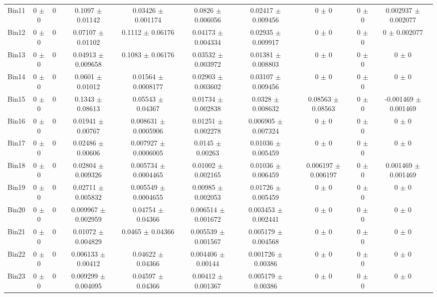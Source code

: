 \begin{tabular}{@{\extracolsep{4pt}}lccccccccc@{}}
     Bin11 & 0 $\pm$ 0 & 0 & 0.1097 $\pm$ 0.01142 & 0.03426 $\pm$ 0.001174 & 0.0826 $\pm$ 0.006056 & 0.02417 $\pm$ 0.009456 & 0 $\pm$ 0 & 0 $\pm$ 0 & 0.002937 $\pm$ 0.002077 \\ 
     Bin12 & 0 $\pm$ 0 & 0 & 0.07107 $\pm$ 0.01102 & 0.1112 $\pm$ 0.06176 & 0.04173 $\pm$ 0.004334 & 0.02935 $\pm$ 0.009917 & 0 $\pm$ 0 & 0 $\pm$ 0 & 0 $\pm$ 0.002077 \\ 
     Bin13 & 0 $\pm$ 0 & 0 & 0.04913 $\pm$ 0.009658 & 0.1083 $\pm$ 0.06176 & 0.03532 $\pm$ 0.003972 & 0.01381 $\pm$ 0.008803 & 0 $\pm$ 0 & 0 $\pm$ 0 & 0 $\pm$ 0 \\ 
     Bin14 & 0 $\pm$ 0 & 0 & 0.0601 $\pm$ 0.01012 & 0.01564 $\pm$ 0.0008177 & 0.02903 $\pm$ 0.003602 & 0.03107 $\pm$ 0.009456 & 0 $\pm$ 0 & 0 $\pm$ 0 & 0 $\pm$ 0 \\ 
     Bin15 & 0 $\pm$ 0 & 0 & 0.1343 $\pm$ 0.08613 & 0.05543 $\pm$ 0.04367 & 0.01734 $\pm$ 0.002838 & 0.0328 $\pm$ 0.008632 & 0.08563 $\pm$ 0.08563 & 0 $\pm$ 0 & -0.001469 $\pm$ 0.001469 \\ 
     Bin16 & 0 $\pm$ 0 & 0 & 0.01941 $\pm$ 0.00767 & 0.008631 $\pm$ 0.0005906 & 0.01251 $\pm$ 0.002278 & 0.006905 $\pm$ 0.007324 & 0 $\pm$ 0 & 0 $\pm$ 0 & 0 $\pm$ 0 \\ 
     Bin17 & 0 $\pm$ 0 & 0 & 0.02486 $\pm$ 0.00606 & 0.007927 $\pm$ 0.0006005 & 0.0145 $\pm$ 0.00263 & 0.01036 $\pm$ 0.005459 & 0 $\pm$ 0 & 0 $\pm$ 0 & 0 $\pm$ 0 \\ 
     Bin18 & 0 $\pm$ 0 & 0 & 0.02804 $\pm$ 0.009326 & 0.005734 $\pm$ 0.0004465 & 0.01002 $\pm$ 0.002165 & 0.01036 $\pm$ 0.006459 & 0.006197 $\pm$ 0.006197 & 0 $\pm$ 0 & 0.001469 $\pm$ 0.001469 \\ 
     Bin19 & 0 $\pm$ 0 & 0 & 0.02711 $\pm$ 0.005832 & 0.005549 $\pm$ 0.0004655 & 0.00985 $\pm$ 0.002053 & 0.01726 $\pm$ 0.005459 & 0 $\pm$ 0 & 0 $\pm$ 0 & 0 $\pm$ 0 \\ 
     Bin20 & 0 $\pm$ 0 & 0 & 0.009967 $\pm$ 0.002959 & 0.04754 $\pm$ 0.04366 & 0.006514 $\pm$ 0.001672 & 0.003453 $\pm$ 0.002441 & 0 $\pm$ 0 & 0 $\pm$ 0 & 0 $\pm$ 0 \\ 
     Bin21 & 0 $\pm$ 0 & 0 & 0.01072 $\pm$ 0.004829 & 0.0465 $\pm$ 0.04366 & 0.005539 $\pm$ 0.001567 & 0.005179 $\pm$ 0.004568 & 0 $\pm$ 0 & 0 $\pm$ 0 & 0 $\pm$ 0 \\ 
     Bin22 & 0 $\pm$ 0 & 0 & 0.006133 $\pm$ 0.00412 & 0.04622 $\pm$ 0.04366 & 0.004406 $\pm$ 0.00144 & 0.001726 $\pm$ 0.00386 & 0 $\pm$ 0 & 0 $\pm$ 0 & 0 $\pm$ 0 \\ 
     Bin23 & 0 $\pm$ 0 & 0 & 0.009299 $\pm$ 0.004095 & 0.04597 $\pm$ 0.04366 & 0.00412 $\pm$ 0.001367 & 0.005179 $\pm$ 0.00386 & 0 $\pm$ 0 & 0 $\pm$ 0 & 0 $\pm$ 0 \\ 

\end{tabular}

